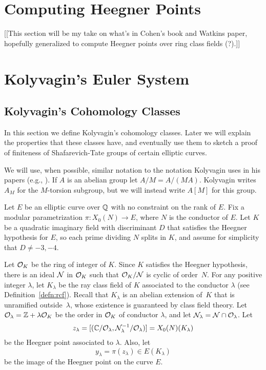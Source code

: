 \section{Computing Heegner Points}
[[This section will be my take on what's in Cohen's book
and Watkins paper, hopefully generalized to compute Heegner
points over ring class fields (?).]]

\section{Kolyvagin's Euler System}
\subsection{Kolyvagin's Cohomology Classes}
In this section we define Kolyvagin's cohomology classes.  Later we
will explain the properties that these classes have, and eventually
use them to sketch a proof of finiteness of Shafarevich-Tate
groups of certain elliptic curves.

We will use, when possible, similar notation to the notation
Kolyvagin uses in his papers (e.g.,
\cite{kolyvagin:structure_of_selmer}).  If $A$ is an abelian group let
$A/M = A/(MA)$.  Kolyvagin writes $A_M$ for the $M$-torsion subgroup,
but we will instead write $A[M]$ for this group.

Let $E$ be an elliptic curve over $\mathbb{Q}$ with no constraint
on the rank of $E$.
Fix a modular parametrization $\pi:X_0(N)\to E$, where $N$
is the conductor of $E$.
Let $K$ be a quadratic imaginary field with discriminant $D$
that satisfies the Heegner hypothesis for $E$, so each
prime dividing $N$ splits in $K$,
and assume for simplicity that $D\neq -3, -4$. 


Let $\mathcal{O}_K$ be the ring of integer of $K$. Since $K$ satisfies the
Heegner hypothesis, there is an ideal $\mathcal{N}$ in $\mathcal{O}_K$ such that
$\mathcal{O}_K/\mathcal{N}$ is cyclic of order~$N$.  For any positive integer
$\lambda$, let $K_{\lambda}$ be the ray class field of $K$
associated to the conductor $\lambda$ (see Definition~\ref{defn:rcf}).
Recall that $K_{\lambda}$ is an abelian extension of~$K$
that is unramified outside~$\lambda$, whose existence is
guaranteed by class field theory.
Let $\mathcal{O}_{\lambda} = \mathbb{Z} + \lambda \mathcal{O}_K$ be the order in $\mathcal{O}_K$
of conductor $\lambda$, and let $\mathcal{N}_{\lambda} = \mathcal{N} \cap \mathcal{O}_{\lambda}$.
Let 
$$
  z_{\lambda} = 
[(\mathbb{C} / \mathcal{O}_{\lambda}, \mathcal{N}_{\lambda}^{-1} / \mathcal{O}_{\lambda})]
  = X_0(N)(K_{\lambda})
$$
be the Heegner point associated to $\lambda$. 
Also, let
$$
  y_{\lambda} = \pi(z_\lambda) \in E(K_{\lambda})
$$
be the image of the Heegner point on the curve $E$.

